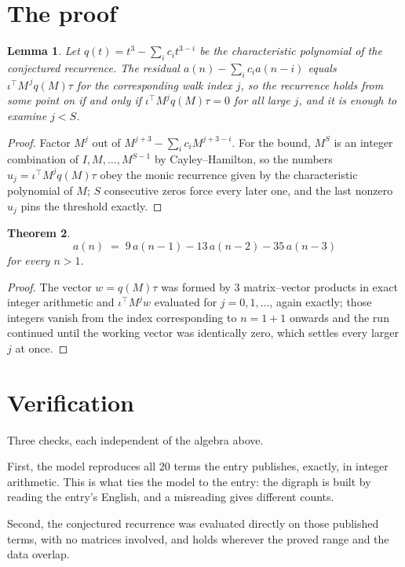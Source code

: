 \documentclass[11pt,a4paper]{article}
\theoremstyle{plain}
\newtheorem{theorem}{Theorem}
\newtheorem{lemma}[theorem]{Lemma}
\theoremstyle{definition}
\begin{document}
\section{The proof}

\begin{lemma}\label{lem:crit}
Let $q(t)=t^{3}-\sum_i c_it^{3-i}$ be the characteristic polynomial of the
conjectured recurrence. The residual $a(n)-\sum_ic_ia(n-i)$ equals
$\iota^{\!\top}M^{\,j}q(M)\tau$ for the corresponding walk index $j$, so the recurrence
holds from some point on if and only if $\iota^{\!\top}M^{j}q(M)\tau=0$ for all large $j$,
and it is enough to examine $j<S$.
\end{lemma}

\begin{proof}
Factor $M^{j}$ out of $M^{j+3}-\sum_ic_iM^{j+3-i}$. For the bound, $M^{S}$
is an integer combination of $I,M,\dots,M^{S-1}$ by Cayley--Hamilton, so the numbers
$u_j=\iota^{\!\top}M^{j}q(M)\tau$ obey the monic recurrence given by the characteristic
polynomial of $M$; $S$ consecutive zeros force every later one, and the last nonzero $u_j$
pins the threshold exactly.
\end{proof}

\begin{theorem}
\[
a(n)\;=\;9\,a(n-1) - 13\,a(n-2) - 35\,a(n-3)
\]
for every $n>1$.
\end{theorem}

\begin{proof}
The vector $w=q(M)\tau$ was formed by $3$ matrix--vector products in exact integer
arithmetic and $\iota^{\!\top}M^{j}w$ evaluated for $j=0,1,\dots$, again exactly; those
integers vanish from the index corresponding to $n=1+1$ onwards and the run continued
until the working vector was identically zero, which settles every larger $j$ at once.
\end{proof}

\section{Verification}

Three checks, each independent of the algebra above.

First, the model reproduces all $20$ terms the entry publishes, exactly, in integer
arithmetic. This is what ties the model to the entry: the digraph is built by reading the
entry's English, and a misreading gives different counts.

Second, the conjectured recurrence was evaluated directly on those published terms, with no
matrices involved, and holds wherever the proved range and the data overlap.
\end{document}
